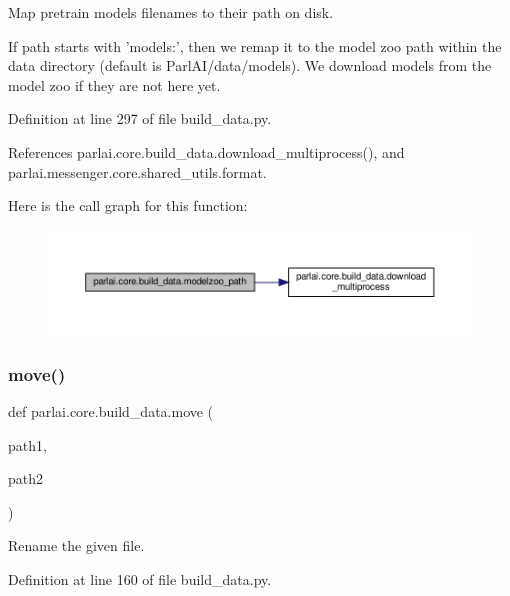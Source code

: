 \begin{DoxyVerb}Map pretrain models filenames to their path on disk.

If path starts with 'models:', then we remap it to the model zoo path
within the data directory (default is ParlAI/data/models).
We download models from the model zoo if they are not here yet.
\end{DoxyVerb}
 

Definition at line 297 of file build\+\_\+data.\+py.



References parlai.\+core.\+build\+\_\+data.\+download\+\_\+multiprocess(), and parlai.\+messenger.\+core.\+shared\+\_\+utils.\+format.

Here is the call graph for this function\+:
\nopagebreak
\begin{figure}[H]
\begin{center}
\leavevmode
\includegraphics[width=350pt]{namespaceparlai_1_1core_1_1build__data_ad06e9e38ca85db9c4a676ccd9ae41649_cgraph}
\end{center}
\end{figure}
\mbox{\label{namespaceparlai_1_1core_1_1build__data_a1678b8a042eeb9d9c8e9de08f52e496b}} 
\subsubsection{\texorpdfstring{move()}{move()}}
{\footnotesize\ttfamily def parlai.\+core.\+build\+\_\+data.\+move (\begin{DoxyParamCaption}\item[{}]{path1,  }\item[{}]{path2 }\end{DoxyParamCaption})}

\begin{DoxyVerb}Rename the given file.\end{DoxyVerb}
 

Definition at line 160 of file build\+\_\+data.\+py.



